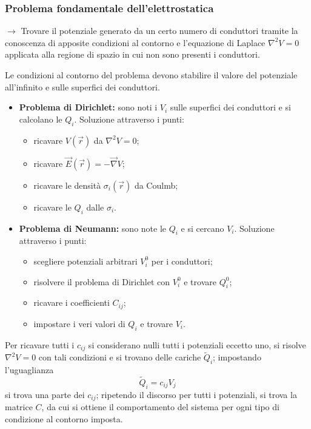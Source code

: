\documentclass[a4paper]{scrartcl}
\numberwithin{equation}{subsection}
\theoremstyle{style1}
\begin{document}
\subsubsection{Problema fondamentale dell'elettrostatica}

$\to$ Trovare il potenziale generato da un certo numero di conduttori tramite la conoscenza di apposite condizioni al contorno e l'equazione di Laplace $\nabla ^2 V = 0$ applicata alla regione di spazio in cui non sono presenti i conduttori.

Le condizioni al contorno del problema devono stabilire il valore del potenziale all'infinito e sulle superfici dei conduttori.

\begin{itemize}
	\item \textbf{Problema di Dirichlet:} sono noti i $V_i$ sulle superfici dei conduttori e si calcolano le $Q_i$. Soluzione attraverso i punti:
		\begin{itemize}
			\item ricavare $V(\vec{r})$ da $\nabla ^2V = 0$;
			\item ricavare $\vec{E}(\vec{r}) = - \vec{\nabla }V$;
			\item ricavare le densit\`a $\sigma _i(\vec{r})$ da Coulmb;
			\item ricavare le $Q_i$ dalle $\sigma _i$.
		\end{itemize}
	\item \textbf{Problema di Neumann:} sono note le $Q_i$ e si cercano $V_i$. Soluzione attraverso i punti:
		\begin{itemize}
			\item scegliere potenziali arbitrari $V_i^0$ per i conduttori;
			\item risolvere il problema di Dirichlet con $V^0_i$ e trovare $Q_i^0$;
			\item ricavare i coefficienti $C_{ij} $;
			\item impostare i veri valori di $Q_i$ e trovare $V_i$.
		\end{itemize}
\end{itemize}
Per ricavare tutti i $c_{ij} $ si considerano nulli tutti i potenziali eccetto uno, si risolve $\nabla ^2 V=0$ con tali condizioni e si trovano delle cariche $\widetilde{Q}_i$; impostando l'uguaglianza
\[
\widetilde{Q}_i = c_{ij}  V_j 
\] 
si trova una parte dei $c_{ij} $; ripetendo il discorso per tutti i potenziali, si trova la matrice $C$, da cui si ottiene il comportamento del sistema per ogni tipo di condizione al contorno imposta.
\end{document}

